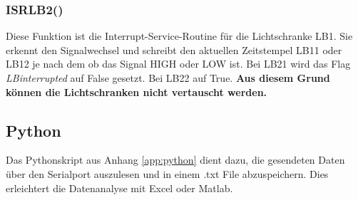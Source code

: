 \subsubsection{ISRLB2()}
Diese Funktion ist die Interrupt-Service-Routine für die Lichtschranke LB1. Sie erkennt den Signalwechsel und schreibt den aktuellen Zeitstempel LB11 oder LB12 je nach dem ob das Signal HIGH oder LOW ist. Bei LB21 wird das Flag \textit{LBinterrupted} auf False gesetzt. Bei LB22 auf True. \textbf{Aus diesem Grund können die Lichtschranken nicht vertauscht werden.}\\


\subsection{Python}
Das Pythonskript aus Anhang \ref{app:python} dient dazu, die gesendeten Daten über den Serialport auszulesen und in einem .txt File abzuspeichern. Dies erleichtert die Datenanalyse mit Excel oder Matlab.